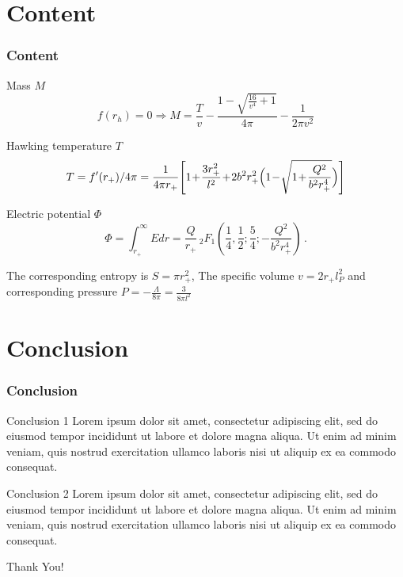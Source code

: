 \documentclass[9pt, dvipsnames]{beamer} %
\begin{document}
    \section{Content}\label{sec:content}
    \begin{frame}
        \frametitle{\textbf{Content}}
        \begin{block}{Mass $M$}
            \begin{equation}
                f(r_h) = 0 \Longrightarrow M = \frac{T}{v}-\frac{1-\sqrt{\frac{16}{v^4}+1}}{4 \pi }-\frac{1}{2 \pi  v^2}
            \end{equation}
        \end{block}
        \begin{exampleblock}{Hawking temperature $T$}
            \begin{equation}\label{eq:T}
                T = f^{\prime}(r_+) / 4 \pi = \frac{1}{4\pi r_+}\!\left[1\!+\!\frac{3r_+^2}{l^2}\!+\!2b^2 r_+^2\Bigl(1\!-\!\sqrt{1\!+\!\frac{Q^2}{b^2 r_+^4}}\Bigr)\right]
            \end{equation}
        \end{exampleblock}
        \begin{alertblock}{Electric potential $\Phi$}
            \begin{equation}
                \Phi=\int_{r_+}^\infty E dr
                =\frac{Q}{r_+}\,{}_2 F_1\!\left(\frac{1}{4},\frac{1}{2};\frac{5}{4};-\frac{Q^2}{b^2 r_+^4}\right)\,.
            \end{equation}
        \end{alertblock}
        The corresponding entropy is $S = \pi r_+^2$, The specific volume $v = 2 r_+ l_P^2$ and corresponding pressure $P = - \frac{\Lambda}{8 \pi} = \frac{3}{8 \pi l^2}$
    \end{frame}

    \section{Conclusion}\label{sec:conclusion}
    \begin{frame}
        \frametitle{Conclusion}
        \begin{block}{Conclusion 1}
            Lorem ipsum dolor sit amet, consectetur adipiscing elit, sed do eiusmod tempor incididunt ut labore et dolore magna aliqua.
            Ut enim ad minim veniam, quis nostrud exercitation ullamco laboris nisi ut aliquip ex ea commodo consequat.
        \end{block}
        \begin{exampleblock}{Conclusion 2}
            Lorem ipsum dolor sit amet, consectetur adipiscing elit, sed do eiusmod tempor incididunt ut labore et dolore magna aliqua.
            Ut enim ad minim veniam, quis nostrud exercitation ullamco laboris nisi ut aliquip ex ea commodo consequat.         \end{exampleblock}
    \end{frame}
    \begin{frame}[noframenumbering]
        \centering
        {\fontsize{40}{50}\selectfont Thank You!}
    \end{frame}
\end{document}
